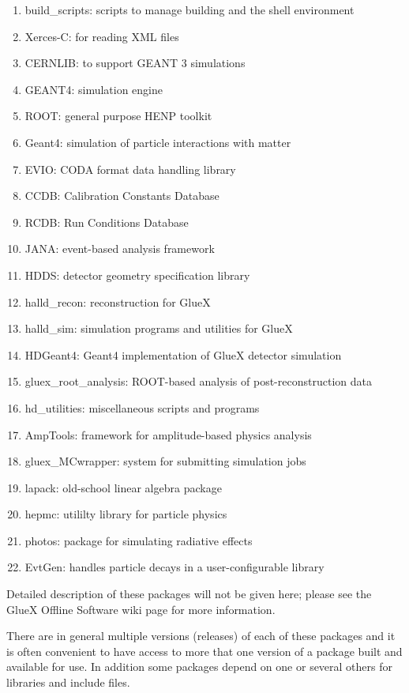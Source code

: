 \documentclass[12pt]{article}
\begin{document}
\begin{enumerate}
\item build\_scripts: scripts to manage building and the shell environment
\item Xerces-C: for reading XML files
\item CERNLIB: to support GEANT 3 simulations
\item GEANT4: simulation engine
\item ROOT: general purpose HENP toolkit
\item Geant4: simulation of particle interactions with matter
\item EVIO: CODA format data handling library
\item CCDB: Calibration Constants Database
\item RCDB: Run Conditions Database
\item JANA: event-based analysis framework
\item HDDS: detector geometry specification library
\item halld\_recon: reconstruction for GlueX
\item halld\_sim: simulation programs and utilities for GlueX
\item HDGeant4: Geant4 implementation of GlueX detector simulation
\item gluex\_root\_analysis: ROOT-based analysis of post-reconstruction data
\item hd\_utilities: miscellaneous scripts and programs
\item AmpTools: framework for amplitude-based physics analysis
\item gluex\_MCwrapper: system for submitting simulation jobs
\item lapack: old-school linear algebra package
\item hepmc: utililty library for particle physics
\item photos: package for simulating radiative effects
\item EvtGen: handles particle decays in a user-configurable library
\end{enumerate}

Detailed description of these packages will not be given here; please
see the GlueX Offline Software wiki page for more information.

There are in general multiple versions (releases) of each of these
packages and it is often convenient to have access to more that one
version of a package built and available for use. In addition some
packages depend on one or several others for libraries and include
files.
\end{document}
